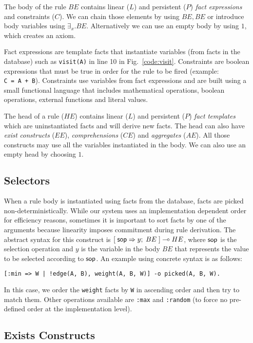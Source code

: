 The body of the rule $BE$ contains linear ($L$) and persistent ($P$) \emph{fact expressions} and
constraints ($C$). We can chain those elements by using $BE, BE$ or introduce body variables using $\exists_{x}. BE$.
Alternatively we can use an empty body by using $1$, which creates an axiom.

Fact expressions are template facts that instantiate variables
(from facts in the database) such as \texttt{visit(A)} in line 10 in Fig.~\ref{code:visit}.
Constraints are boolean expressions that must
be true in order for the rule to be fired (example: \texttt{C~=~A~+~B}). Constraints use variables from fact expressions and are built using a small functional language that includes mathematical operations, boolean operations, external functions and literal values.

The head of a rule ($HE$) contains linear ($L$) and persistent ($P$) \emph{fact templates} which are uninstantiated facts and will derive new facts. The head can also have \emph{exist constructs} ($EE$), \emph{comprehensions} ($CE$) and \emph{aggregates} ($AE$). All those constructs
may use all the variables instantiated in the body. We can also use an empty head by choosing $1$.

\subsection{Selectors}

When a rule body is instantiated using facts from the database, facts are picked
non-deterministically. While our system uses an implementation dependent order for
efficiency reasons, sometimes it is important to sort facts by one of the arguments
because linearity imposes commitment during rule derivation. The abstract syntax for
this construct is $[\; \mathsf{sop} \Rightarrow y; \; BE \;] \multimap HE$, where
$\mathsf{sop}$ is the selection operation and $y$ is the variable in the body $BE$ that
represents the value to be selected according to $\mathsf{sop}$.
An example using concrete syntax is as follows:

\begin{Verbatim}
[:min => W | !edge(A, B), weight(A, B, W)] -o picked(A, B, W).
\end{Verbatim}

In this case, we order the \texttt{weight} facts by \texttt{W} in ascending order and then try
to match them. Other operations available are \texttt{:max} and \texttt{:random} (to force no pre-defined order at the
implementation level).

\subsection{Exists Constructs}

